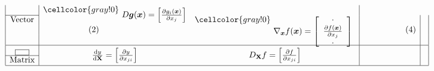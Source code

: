 \documentclass[12pt,thmsa]{article}
\begin{document}
\[\begin{aligned}
\begin{array}{|c|cc|cc|c|}
		&  \cellcolor{gray!0} \multirow{2}{*}{ \( D \boldsymbol{g}(\boldsymbol{x}) =\left[\frac{\partial g_i(\boldsymbol{x})}{\partial x_j}\right] \)} & \\  %
		\cline{1-1}
		\text{Vector} & &  \cellcolor{gray!0} \multirow{3}{*}{ \(\nabla_{\boldsymbol{x}} f(\boldsymbol{x}) =\left[\begin{array}{c} 
				\cdot \\ \frac{\partial f(\boldsymbol{x})}{\partial x_j} \\ \cdot  \end{array}
		\right]\) } & & &  \\  %
		& (2) \qquad \qquad \quad & & & \qquad \qquad (4) & \\  %
		&  & & &  & \\  %
		\hline
		\fbox{\vspace{1em}\hspace{1em}}
		& \multirow{2}{*}{ \( \frac{\mathrm{d} y}{\mathrm{d} \mathbf{X}}=\left[\frac{\partial y}{\partial x_{j i}}\right] \) }
		&  \multirow{2}{*}{ \( D_{\mathbf{X}} f=\left[\frac{\partial f}{\partial x_{j i}}\right] \) } & & & \\  %
		\cline{1-1} \text{Matrix} & & & & &  \\  %
		\hline
	\end{array}
\end{aligned}
\]
\end{document}
